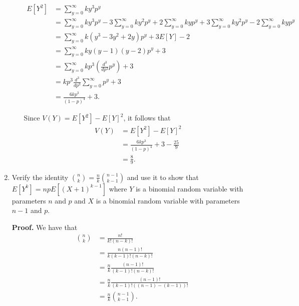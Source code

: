 \documentclass[9pt]{article}
\newcommand{\D}{\displaystyle}
\begin{document}
\begin{enumerate}
\begin{enumerate}
\begin{align*}
                  E[Y^2] &= \sum_{y=0}^\infty ky^3p^y \\
                       &= \sum_{y=0}^\infty ky^3p^y - 3\sum_{y=0}^\infty ky^2p^y
                          + 2\sum_{y=0}^\infty kyp^y
                          + 3\sum_{y=0}^\infty ky^2p^y
                          - 2\sum_{y=0}^\infty kyp^y   \\
                       &= \sum_{y=0}^\infty k(y^3-3y^2+2y)p^y + 3E[Y] - 2 \\
                       &= \sum_{y=0}^\infty ky(y-1)(y-2)p^y + 3 \\
                       &= \sum_{y=0}^\infty kp^3\left(\frac{d^3}{dp^3}p^y\right)
                          + 3 \\
                       &= kp^3\frac{d^3}{dp^3}\sum_{y=0}^\infty p^y + 3 \\
                       &= \frac{6kp^3}{(1 - p)^4} + 3.
               \end{align*}
               
               Since $V(Y) = E[Y^2] - E[Y]^2$, it follows that
               \begin{align*}
                  V(Y) &= E[Y^2] - E[Y]^2 \\
                       &= \frac{6kp^3}{(1 - p)^4} + 3 - \frac{25}{9} \\
                       &= \frac{8}{9}.
               \end{align*}
      \end{enumerate}
   \item Verify the identity $\D\binom{n}{k} = \frac{n}{k}\binom{n-1}{k-1}$ and
         use it to show that $E[Y^k] = npE[(X+1)^{k-1}]$ where $Y$ is a binomial
         random variable with parameters $n$ and $p$ and $X$ is a binomial
         random variable with parameters $n - 1$ and $p$.

      \textbf{Proof.} We have that
      \begin{align*}
         \binom{n}{k} &= \frac{n!}{k!(n - k)!} \\
            &= \frac{n(n - 1)!}{k(k - 1)!(n - k)!} \\
            &= \frac{n}{k}\frac{(n - 1)!}{(k - 1)!(n - k)!} \\
            &= \frac{n}{k}\frac{(n - 1)!}{(k - 1)!((n - 1) - (k - 1))!} \\
            &= \frac{n}{k}\binom{n - 1}{k - 1}.
      \end{align*}


\end{enumerate}
\end{document}
